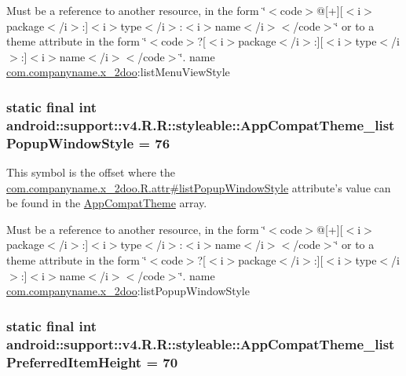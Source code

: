 Must be a reference to another resource, in the form \char`\"{}$<$code$>$@\mbox{[}+\mbox{]}\mbox{[}$<$i$>$package$<$/i$>$:\mbox{]}$<$i$>$type$<$/i$>$:$<$i$>$name$<$/i$>$$<$/code$>$\char`\"{} or to a theme attribute in the form \char`\"{}$<$code$>$?\mbox{[}$<$i$>$package$<$/i$>$:\mbox{]}\mbox{[}$<$i$>$type$<$/i$>$:\mbox{]}$<$i$>$name$<$/i$>$$<$/code$>$\char`\"{}.  name \hyperlink{namespacecom_1_1companyname_1_1x__2doo}{com.companyname.x\_\-2doo}:listMenuViewStyle \hypertarget{classandroid_1_1support_1_1v4_1_1_r_1_1styleable_bd2ee13ff17345e9f5fe98bc84202b71}{
\subsubsection[{AppCompatTheme\_\-listPopupWindowStyle}]{\setlength{\rightskip}{0pt plus 5cm}static final int android::support::v4.R.R::styleable::AppCompatTheme\_\-listPopupWindowStyle = 76}}
\label{classandroid_1_1support_1_1v4_1_1_r_1_1styleable_bd2ee13ff17345e9f5fe98bc84202b71}


This symbol is the offset where the \hyperlink{classcom_1_1companyname_1_1x__2doo_1_1_r_1_1attr_986d9487bc98d9a809d4c913d0fbc2dd}{com.companyname.x\_\-2doo.R.attr\#listPopupWindowStyle} attribute's value can be found in the \hyperlink{classandroid_1_1support_1_1v4_1_1_r_1_1styleable_0873e92ba21076bb5a4aeadeb7f5779f}{AppCompatTheme} array.

Must be a reference to another resource, in the form \char`\"{}$<$code$>$@\mbox{[}+\mbox{]}\mbox{[}$<$i$>$package$<$/i$>$:\mbox{]}$<$i$>$type$<$/i$>$:$<$i$>$name$<$/i$>$$<$/code$>$\char`\"{} or to a theme attribute in the form \char`\"{}$<$code$>$?\mbox{[}$<$i$>$package$<$/i$>$:\mbox{]}\mbox{[}$<$i$>$type$<$/i$>$:\mbox{]}$<$i$>$name$<$/i$>$$<$/code$>$\char`\"{}.  name \hyperlink{namespacecom_1_1companyname_1_1x__2doo}{com.companyname.x\_\-2doo}:listPopupWindowStyle \hypertarget{classandroid_1_1support_1_1v4_1_1_r_1_1styleable_54d99bb5430cafe306a647e9b8c23557}{
\subsubsection[{AppCompatTheme\_\-listPreferredItemHeight}]{\setlength{\rightskip}{0pt plus 5cm}static final int android::support::v4.R.R::styleable::AppCompatTheme\_\-listPreferredItemHeight = 70}}
\label{classandroid_1_1support_1_1v4_1_1_r_1_1styleable_54d99bb5430cafe306a647e9b8c23557}


